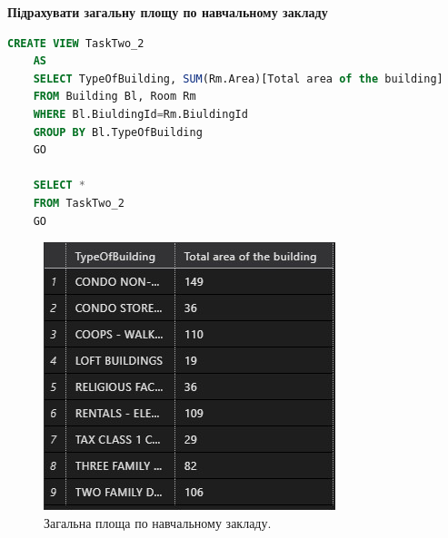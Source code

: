 \documentclass[a4paper,12pt]{article}
\begin{document}
\newpage
	\textbf{Підрахувати загальну площу по навчальному закладу}
	\begin{lstlisting}[language=SQL]
	CREATE VIEW TaskTwo_2
	AS
	SELECT TypeOfBuilding, SUM(Rm.Area)[Total area of the building]
	FROM Building Bl, Room Rm
	WHERE Bl.BiuldingId=Rm.BiuldingId
	GROUP BY Bl.TypeOfBuilding
	GO
	
	SELECT *
	FROM TaskTwo_2
	GO
	\end{lstlisting}
	\begin{figure}[h!]
		\begin{minipage}[h]{1\linewidth}
			\centering
			\includegraphics[width=0.7\linewidth]{Prt sc/Figure_3.jpg}  
		\end{minipage}
		\caption{Загальна площа по навчальному закладу.}
	\end{figure}
\end{document}
